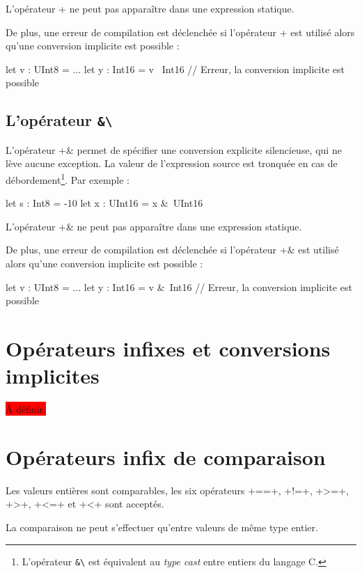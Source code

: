 L'opérateur \plm+\+ ne peut pas apparaître dans une expression statique.

De plus, une erreur de compilation est déclenchée si l'opérateur \plm+\+ est utilisé alors qu'une conversion implicite est possible :
\begin{PLM}
let v : UInt8 = ...
let y : Int16 = v \ Int16 // Erreur, la conversion implicite est possible
\end{PLM}

\subsection{L'opérateur \texttt{\&\textbackslash}}

L'opérateur \plm+&\+ permet de spécifier une conversion explicite silencieuse, qui ne lève aucune exception. La valeur de l'expression source est tronquée en cas de débordement\footnote{L'opérateur \texttt{\&\textbackslash} est équivalent au \emph{type cast} entre entiers du langage C.}. Par exemple :

\begin{PLM}
let s : Int8 = -10
let x : UInt16 = x &\ UInt16
\end{PLM}

L'opérateur \plm+&\+ ne peut pas apparaître dans une expression statique.

De plus, une erreur de compilation est déclenchée si l'opérateur \plm+&\+ est utilisé alors qu'une conversion implicite est possible :
\begin{PLM}
let v : UInt8 = ...
let y : Int16 = v &\ Int16 // Erreur, la conversion implicite est possible
\end{PLM}

\section{Opérateurs infixes et conversions implicites}

\colorbox{red}{À définir.}

\section{Opérateurs infix de comparaison}

Les valeurs entières sont comparables, les six opérateurs \plm+==+, \plm+!=+, \plm+>=+, \plm+>+, \plm+<=+ et \plm+<+ sont acceptés.

La comparaison ne peut s'effectuer qu'entre valeurs de même type entier.









